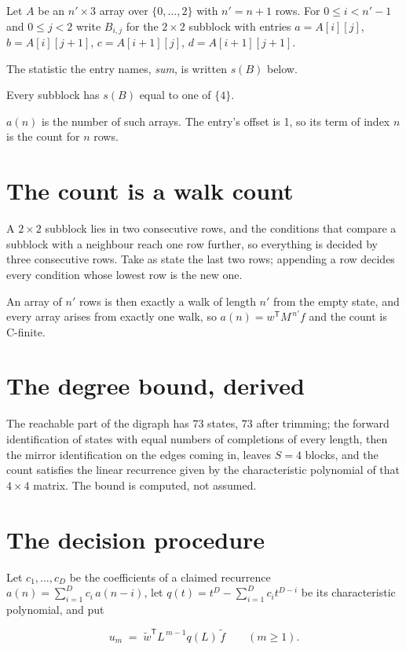\documentclass[11pt]{article}
\theoremstyle{definition}
\begin{document}
Let $A$ be an $n' \times 3$ array over $\{0,\dots,2\}$ with $n' = n + 1$ rows. For $0 \le i < n'-1$ and $0 \le j < 2$ write $B_{i,j}$ for the $2\times2$ subblock with entries $a = A[i][j]$, $b = A[i][j{+}1]$, $c = A[i{+}1][j]$, $d = A[i{+}1][j{+}1]$.

The statistic the entry names, {\itshape sum}, is written $s(B)$ below.

Every subblock has $s(B)$ equal to one of $\{4\}$.

$a(n)$ is the number of such arrays. The entry's offset is 1, so its term of index $n$ is the count for $n$ rows.

\section{The count is a walk count}

A $2\times2$ subblock lies in two consecutive rows, and the conditions that compare a subblock with a neighbour reach one row further, so everything is decided by three consecutive rows. Take as state the last two rows; appending a row decides every condition whose lowest row is the new one.

An array of $n'$ rows is then exactly a walk of length $n'$ from the empty state, and every array arises from exactly one walk, so $a(n) = w^{\mathsf T}M^{\,n'}f$ and the count is C-finite.

\section{The degree bound, derived}

The reachable part of the digraph has $73$ states, $73$ after trimming; the forward identification of states with equal numbers of completions of every length, then the mirror identification on the edges coming in, leaves $S = 4$ blocks, and the count satisfies the linear recurrence given by the characteristic polynomial of that $4\times4$ matrix. The bound is computed, not assumed.

\section{The decision procedure}

Let $c_1,\dots,c_D$ be the coefficients of a claimed recurrence $a(n) = \sum_{i=1}^{D} c_i\,a(n-i)$, let $q(t) = t^{D} - \sum_{i=1}^{D} c_i t^{D-i}$ be its characteristic polynomial, and put

\[u_m \;=\; \tilde w^{\mathsf T} L^{\,m-1} q(L)\,\tilde f \qquad (m \ge 1).\]
\end{document}
